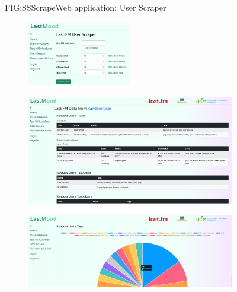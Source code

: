 \begin{figure}[Web application: User Scraper]{FIG:SSScrape}{Web application: User Scraper}
    \begin{subfigure}[SBFIG:SSScrapeForm]{User scraper form}{\includegraphics[width=0.5\textwidth]{img/SSScrapeForm.png}}
    \end{subfigure}
    \begin{subfigure}[SBFIG:SSScrape1]{Example with limited results}{\includegraphics[width=1\textwidth]{img/SSScrape1.png}}
    \end{subfigure}
    \begin{subfigure}[SBFIG:SSScrape2]{Tag frequency pie chart}{\includegraphics[width=1\textwidth]{img/SSScrape2.png}}
    \end{subfigure}
\end{figure}

